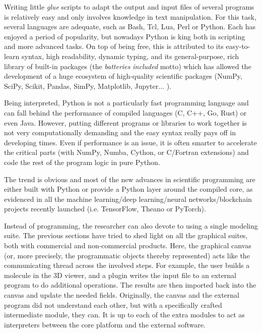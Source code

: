 Writing little \textit{glue} scripts to adapt the output and input files of several programs is relatively easy and only involves knowledge in text manipulation. For this task, several languages are adequate, such as Bash, Tcl, Lua, Perl or Python. Each has enjoyed a period of popularity, but nowadays Python is king both in scripting and more advanced tasks.\cite{pythonpaypal} On top of being free, this is attributed to its easy-to-learn syntax, high readability, dynamic typing, and its general-purpose, rich library of built-in packages (the \textit{batteries included} motto) which has allowed the development of a huge ecosystem of high-quality scientific packages (NumPy, SciPy, Scikit, Pandas, SimPy, Matplotlib, Jupyter$ \ldots $ ).

Being interpreted, Python is not a particularly fast programming language and can fall behind the performance of compiled languages (C, C++, Go, Rust) or even Java. However, putting different programs or libraries to work together is not very computationally demanding and the easy syntax really pays off in developing times. Even if performance is an issue, it is often smarter to accelerate the critical parts (with NumPy,\cite{numpy} Numba,\cite{numba} Cython,\cite{cython} or C/Fortran extensions) and code the rest of the program logic in pure Python.

The trend is obvious and most of the new advances in scientific programming are either built with Python or provide a Python layer around the compiled core, as evidenced in all the machine learning/deep learning/neural networks/blockchain projects recently launched (i.e. TensorFlow,\cite{tensorflow} Theano\cite{theano} or PyTorch\cite{pytorch}).


Instead of programming, the researcher can also devote to using a single modeling suite. The previous sections have tried to shed light on all the graphical suites, both with commercial and non-commercial products. Here, the graphical canvas (or, more precisely, the programmatic objects thereby represented) acts like the communicating thread across the involved steps. For example, the user builds a molecule in the 3D viewer, and a plugin writes the input file to an external program to do additional operations. The results are then imported back into the canvas and update the needed fields. Originally, the canvas and the external program did not understand each other, but with a specifically crafted intermediate module, they can. It is up to each of the extra modules to act as interpreters between the core platform and the external software.

